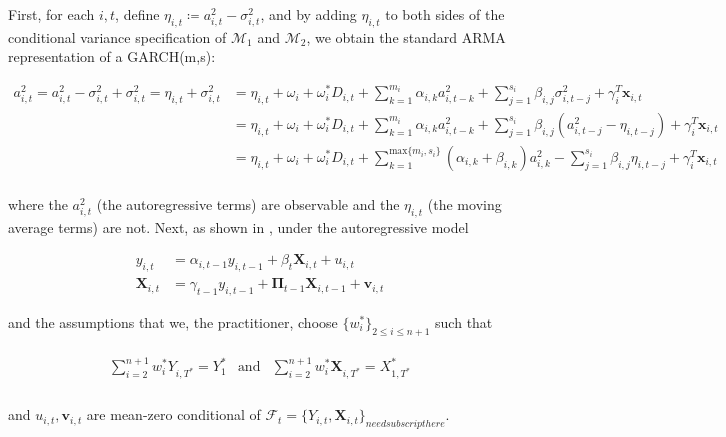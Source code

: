 \documentclass[11pt]{article}
\newcommand{\x}{\textbf{x}}
\def\mc#1{\mathcal{#1}} %
\def\mc#1{\mathcal{#1}}
\theoremstyle{definition}
\newenvironment{proof-of-proposition}[1][{}]{\noindent{\bf
    Proof of Proposition {#1}}
  \hspace*{.5em}}{\qed\bigskip\\}
\begin{document}
\begin{proof-of-proposition}
First, for each $i,t$, define $\eta_{i,t} \coloneqq a^{2}_{i,t} - \sigma^{2}_{i,t}$, and by adding $\eta_{i,t}$ to both sides of the conditional variance specification of $\mc{M}_1$ and $\mc{M}_2$, we obtain the standard ARMA representation of a GARCH(m,s):

\begin{align*}
a^{2}_{i,t} = a^{2}_{i,t} - \sigma^{2}_{i,t} + \sigma^{2}_{i,t} = \eta_{i,t} + \sigma^{2}_{i,t} &= \eta_{i,t} + \omega_{i} + \omega^{*}_i D_{i,t}  + \sum^{m_{i}}_{k=1}\alpha_{i,k}a^{2}_{i,t-k} + \sum_{j=1}^{s_{i}}\beta_{i,j}\sigma_{i,t-j}^{2} + \gamma_{i}^{T} \x_{i,t} \\
    &= \eta_{i,t} + \omega_{i} + \omega^{*}_i D_{i,t}  + \sum^{m_{i}}_{k=1}\alpha_{i,k}a^{2}_{i,t-k}  + \sum_{j=1}^{s_{i}}\beta_{i,j}(a^{2}_{i,t-j} - \eta_{i,t-j}) + \gamma_{i}^{T} \x_{i,t} \\
    &= \eta_{i,t} + \omega_{i} + \omega^{*}_i D_{i,t}  + \sum^{\text{max}\{m_{i},s_{i}\}}_{k=1}(\alpha_{i,k} + \beta_{i,k})a^{2}_{i,k} - \sum_{j=1}^{s_{i}}\beta_{i,j}\eta_{i,t-j} + \gamma_{i}^{T} \x_{i,t} \\
\end{align*}

where the $a^{2}_{i,t}$ (the autoregressive terms) are observable and the $\eta_{i,t}$ (the moving average terms) are not.  Next, as shown in \citet{abadie2010synthetic}, under the autoregressive model 

\begin{align*}
  y_{i,t} &= \alpha_{i,t-1}y_{i,t-1} + \beta_{t} \bm{X}_{i,t}  + u_{i,t} \\
 \textbf{X}_{i,t} &= \gamma_{t-1}y_{i,t-1} + \bm{\Pi}_{t-1}\bm{X}_{i,t-1} + \bm{v}_{i,t} 
\end{align*}

and the assumptions that we, the practitioner, choose $\{w_{i}^{*}\}_{2\leq i \leq n + 1}$ such that

\begin{align*}
\begin{array}{lll}
\sum^{n+1}_{i=2}w_{i}^{*}Y_{i,T^{*}} = Y_{1}^{*} & \text{and} & \sum^{n+1}_{i=2}w_{i}^{*}\bm{X}_{i,T^{*}} = X_{1,T^{*}}^{*} \\
\end{array}\label{Abadie assumptions}
\end{align*}

and $u_{i,t}, \bm{v}_{i,t}$ are mean-zero conditional of $\mathcal{F}_{t} = \{Y_{i,t}, \bm{X}_{i,t}\}_{need subscript here}$.


\end{proof-of-proposition}
\end{document}
